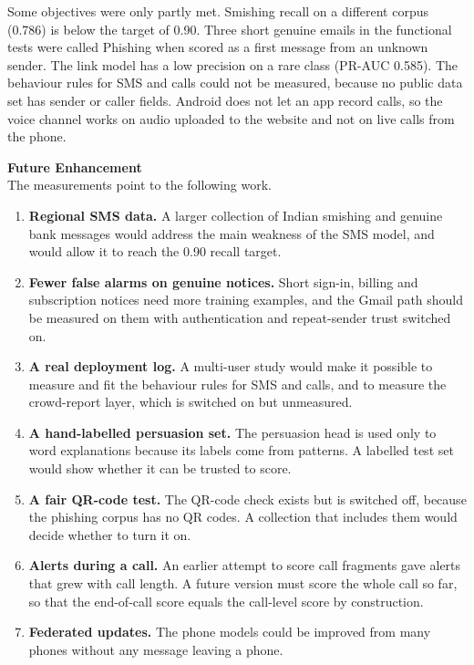 {Some objectives were only partly met. Smishing recall on a different corpus (0.786) is below the target of 0.90. Three short genuine emails in the functional tests were called Phishing when scored as a first message from an unknown sender. The link model has a low precision on a rare class (PR-AUC 0.585). The behaviour rules for SMS and calls could not be measured, because no public data set has sender or caller fields. Android does not let an app record calls, so the voice channel works on audio uploaded to the website and not on live calls from the phone.

\vspace{0.4cm}
\noindent\textbf{\Large Future Enhancement}\\[0.2cm]
The measurements point to the following work.
\begin{enumerate}
\item \textbf{Regional SMS data.} A larger collection of Indian smishing and genuine bank messages would address the main weakness of the SMS model, and would allow it to reach the 0.90 recall target.
\item \textbf{Fewer false alarms on genuine notices.} Short sign-in, billing and subscription notices need more training examples, and the Gmail path should be measured on them with authentication and repeat-sender trust switched on.
\item \textbf{A real deployment log.} A multi-user study would make it possible to measure and fit the behaviour rules for SMS and calls, and to measure the crowd-report layer, which is switched on but unmeasured.
\item \textbf{A hand-labelled persuasion set.} The persuasion head is used only to word explanations because its labels come from patterns. A labelled test set would show whether it can be trusted to score.
\item \textbf{A fair QR-code test.} The QR-code check exists but is switched off, because the phishing corpus has no QR codes. A collection that includes them would decide whether to turn it on.
\item \textbf{Alerts during a call.} An earlier attempt to score call fragments gave alerts that grew with call length. A future version must score the whole call so far, so that the end-of-call score equals the call-level score by construction.
\item \textbf{Federated updates.} The phone models could be improved from many phones without any message leaving a phone.
\end{enumerate}

}
